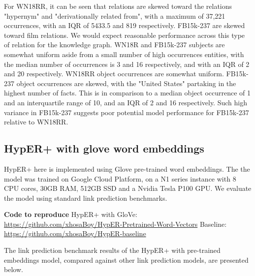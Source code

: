 \noindent For WN18RR, it can be seen that relations are skewed toward the relations "hypernym" and "derivationally related from", with a maximum of 37,221 occurrences, with an IQR of 5433.5 and 819 respectively. FB15k-237 are skewed toward film relations. We would expect reasonable performance across this type of relation for the knowledge graph. WN18R and FB15k-237 subjects are somewhat uniform aside from a small number of high occurrences entities, with the median number of occurrences is 3 and 16 respectively, and with an IQR of 2 and 20 respectively. WN18RR object occurrences are somewhat uniform. FB15k-237 object occurrences are skewed, with the "United States" partaking in the highest number of facts. This is in comparison to a median object occurrence of 1 and an interquartile range of 10,
and an IQR of 2 and 16 respectively. Such high variance in FB15k-237 suggests poor potential model performance for FB15k-237 relative to WN18RR. 



\subsection{HypER+ with glove word embeddings}

HypER+ here is implemented using Glove pre-trained word embeddings. The the model was trained on Google Cloud Platform, on a N1 series instance with  8 CPU cores, 30GB RAM, 512GB SSD and a Nvidia Tesla P100 GPU. We evaluate the model using standard link prediction benchmarks. \par 

\noindent \textbf{Code to reproduce} \newline
HypER+ with GloVe: \url{https://github.com/xhosaBoy/HypER-Pretrained-Word-Vectors} \newline
Baseline: \url{https://github.com/xhosaBoy/HypER-baseline} 

 The link prediction benchmark results of the HypER+ with pre-trained embeddings model, compared against other link prediction models, are presented below.


